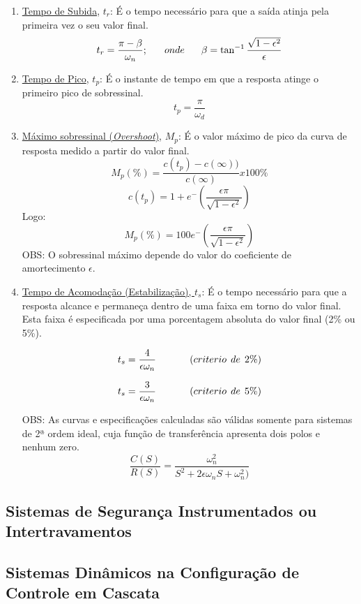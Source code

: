 \begin{enumerate}
    \item \underline{Tempo de Subida}, \textbf{\(t_r\)}: É o tempo necessário para que a saída atinja pela primeira vez o seu valor final.
    \newline
    \[t_r=\frac{\pi-\beta}{\omega_n}; \hspace{4ex} onde \hspace{4ex} \beta=\tan^{-1}\frac{\sqrt{1-\epsilon^2}}{\epsilon}\]
    \newline
    \item \underline{Tempo de Pico}, \textbf{\(t_p\)}: É o instante de tempo em que a resposta atinge o primeiro pico de sobressinal.
    \[t_p=\frac{\pi}{\omega_d}\]
    \newline
    \item \underline{Máximo sobressinal (\textit{Overshoot})}, \textbf{\(M_p\)}: É o valor máximo de pico da curva de resposta medido a partir do valor final.
    \[M_p(\%)=\frac{c(t_p)-c(\infty))}{c(\infty)}x100\%\]
    \[c(t_p)=1+e^-({\frac{\epsilon\pi}{\sqrt{1-\epsilon^2}}})\]
    Logo: \newline
    \[M_p(\%)=100e^-({\frac{\epsilon\pi}{\sqrt{1-\epsilon^2}}})\]
    OBS: O sobressinal máximo depende do valor do coeficiente de amortecimento \(\epsilon\).
    \newline
    \item \underline{Tempo de Acomodação (Estabilização), \(t_s\)}: É o tempo necessário para que a resposta alcance e permaneça dentro de uma faixa em torno do valor final. Esta faixa é especificada por uma porcentagem absoluta do valor final (2\% ou 5\%).
    
    \[t_s=\frac{4}{\epsilon\omega_n} \hspace{8ex} (criterio \hspace{1ex} de \hspace{1ex} 2\%)\]
    
    \[t_s=\frac{3}{\epsilon\omega_n} \hspace{8ex} (criterio \hspace{1ex} de \hspace{1ex} 5\%)\]
    
OBS: As curvas e especificações calculadas são válidas somente para sistemas de 2ª ordem ideal, cuja função de transferência apresenta dois polos e nenhum zero.
    \[\frac{C(S)}{R(S)}=\frac{\omega_n^2}{S^2+2\epsilon\omega_nS+\omega_n^2)}\]
\end{enumerate}

\subsection{Sistemas de Segurança Instrumentados ou Intertravamentos}\hspace{4ex}

\subsection{Sistemas Dinâmicos na Configuração de Controle em Cascata}\hspace{4ex}